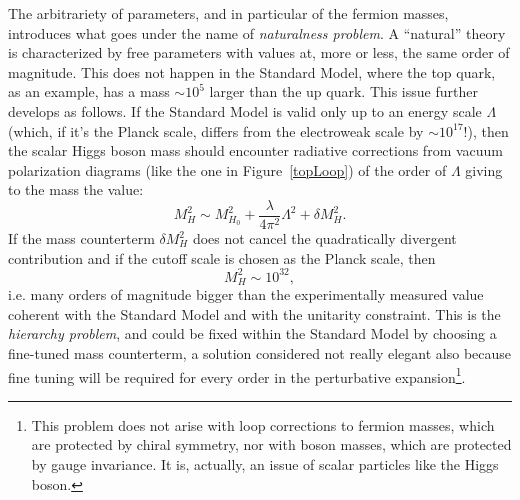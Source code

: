 The arbitrariety of parameters, and in particular of the
fermion masses, introduces what goes under the name of
{\it naturalness problem}. A ``natural'' theory is
characterized by free parameters with values at, more or
less, the same order of magnitude. This does not happen in
the Standard Model, where the top quark, as an example,
has a mass $\sim 10^5$ larger than the up quark.
This issue further develops as follows. If the 
Standard Model is valid only up to  an energy scale 
$\Lambda$ (which, if it's the Planck scale, differs
from the electroweak scale by $\sim 10^{17}$!), 
then the scalar Higgs boson mass 
should encounter radiative corrections from 
vacuum polarization diagrams (like the one in Figure~\ref{topLoop}) 
of the order of $\Lambda$ giving to the mass the 
value: %
\begin{equation}\label{eq:higgsMass}
M_{H}^{2} \sim M_{H_{0}}^{2} 
+ \dfrac{\lambda}{4\pi^{2}} \Lambda^{2} 
+ \delta M_{H}^{2}. \end{equation}
If the mass counterterm $\delta M_{H}^{2}$ does not 
cancel the quadratically divergent contribution and 
if the cutoff scale is chosen as the Planck scale, then
\begin{equation}
M_{H}^{2} \sim 10^{32},\end{equation} 
i.e. many orders of magnitude bigger than the experimentally 
measured value coherent with the Standard Model 
and with the unitarity constraint. This  
is the \textit{hierarchy problem}, and 
could be fixed within the Standard Model by 
choosing a fine-tuned mass counterterm, a 
solution considered not really elegant also 
because fine tuning will be required for every 
order in the perturbative expansion\footnote{This 
problem does not arise with loop corrections to 
fermion masses, which are protected by chiral 
symmetry, nor with boson masses,
which are protected by gauge invariance. It
is, actually, an issue of scalar particles
like the Higgs boson.}. %


